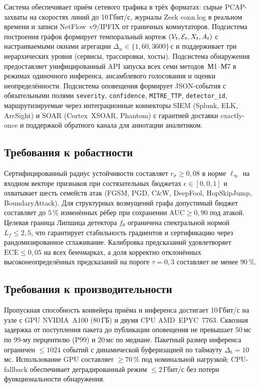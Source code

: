Система обеспечивает приём сетевого трафика в трёх форматах: сырые PCAP-захваты на скоростях линий до 10\,Гбит/с, журналы Zeek conn.log в реальном времени и записи NetFlow~v9/IPFIX от граничных коммутаторов. Подсистема построения графов формирует темпоральный кортеж $(\mathcal{V}_t,\mathcal{E}_t,X_t,A_t)$ с настраиваемыми окнами агрегации $\Delta_w\in\{1,60,3600\}$\,с и поддерживает три иерархических уровня (сервисы, трассировки, хосты). Подсистема обнаружения предоставляет унифицированный API запуска всех семи методов~М1--М7 в режимах одиночного инференса, ансамблевого голосования и оценки неопределённости. Подсистема оповещения формирует JSON-события с обязательными полями \texttt{severity}, \texttt{confidence}, \texttt{MITRE\_TTP}, \texttt{detector\_id}, маршрутизируемые через интеграционные коннекторы SIEM (Splunk, ELK, ArcSight) и SOAR (Cortex~XSOAR, Phantom) с гарантией доставки exactly-once и поддержкой обратного канала для аннотации аналитиком.

\subsection{Требования к робастности}
\label{subsec:req_robustness}

Сертифицированный радиус устойчивости составляет $r_\sigma\geq 0{,}08$ в норме $\ell_\infty$ на входном векторе признаков при состязательных бюджетах $\epsilon\in[0,0{,}1]$ и охватывает шесть семейств атак (FGSM, PGD, C\&W, DeepFool, HopSkipJump, BoundaryAttack). Для структурных возмущений графа допустимый бюджет составляет до $5\,\%$ изменённых рёбер при сохранении AUC$\geq 0{,}90$ под атакой. Целевая граница Липшица детектора $f_\theta$ ограничена спектральной нормой $L_f\leq 2{,}5$, что гарантирует стабильность градиентов и сертификацию через рандомизированное сглаживание. Калибровка предсказаний удовлетворяет $\mathrm{ECE}\leq 0{,}05$ на всех бенчмарках, а доля корректно отклонённых высоконеопределённых предсказаний на пороге $\tau=0{,}3$ составляет не менее $90\,\%$.

\subsection{Требования к производительности}
\label{subsec:req_performance}

Пропускная способность конвейера приёма и инференса достигает 10\,Гбит/с на узле с GPU NVIDIA~A100 (80\,ГБ) и двумя CPU AMD~EPYC~7763. Сквозная задержка от поступления пакета до публикации оповещения не превышает $50\,$мс по 99-му перцентилю (P99) и $20\,$мс по медиане. Пакетный размер инференса ограничен $\leq 1024$ событий с динамической буферизацией по таймауту $\Delta_b=10\,$мс. Использование GPU составляет $\geq 70\,\%$ под номинальной нагрузкой; CPU-fallback обеспечивает деградированный режим $\leq 2\,$Гбит/с без потери функциональности обнаружения.

